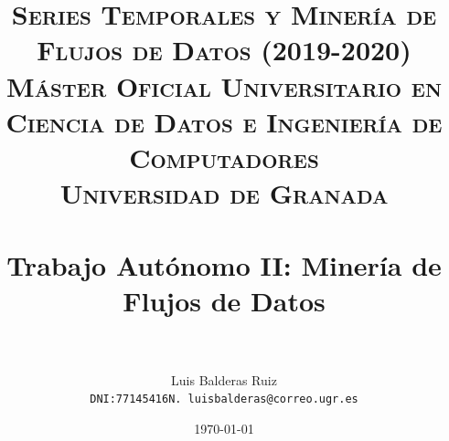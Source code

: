 
\graphicspath{ {./images/} }
\usepackage{subcaption}
\usepackage{hyperref}
\usepackage{soul}



\title{	
\normalfont \normalsize 
\textsc{\textbf{Series Temporales y Minería de Flujos de Datos (2019-2020)} \\ Máster Oficial Universitario en Ciencia de Datos e Ingeniería de Computadores \\ Universidad de Granada} \\ [25pt] %
\horrule{0.5pt} \\[0.4cm] %
\huge Trabajo Autónomo II: Minería de Flujos de Datos \\ %
\horrule{2pt} \\[0.5cm] %
}

\author{Luis Balderas Ruiz \\ \texttt{DNI:77145416N. luisbalderas@correo.ugr.es}} 


\date{\normalsize\today} %




\maketitle %

\newpage %

\tableofcontents %

\listoffigures


%


